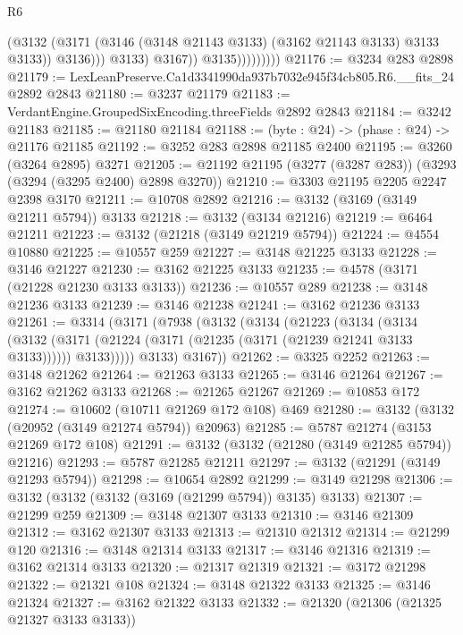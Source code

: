 \begin{lexlean}{R6}
\begin{coremodule}
                                (@3132
                                  (@3171
                                    (@3146 (@3148 @21143 @3133) (@3162 @21143 @3133) @3133 @3133))
                                  @3136)))
                            @3133)
                          @3167))
                      @3135)))))))))
@21176 := @3234 @283 @2898
@21179 := LexLeanPreserve.Ca1d3341990da937b7032e945f34cb805.R6.__fits_24 @2892 @2843
@21180 := @3237 @21179
@21183 := VerdantEngine.GroupedSixEncoding.threeFields @2892 @2843
@21184 := @3242 @21183
@21185 := @21180 @21184
@21188 := (byte : @24) -> (phase : @24) -> @21176 @21185
@21192 := @3252 @283 @2898 @21185 @2400
@21195 := @3260 (@3264 @2895) @3271
@21205 := @21192 @21195 (@3277 (@3287 @283)) (@3293 (@3294 (@3295 @2400) @2898 @3270))
@21210 := @3303 @21195 @2205 @2247 @2398 @3170
@21211 := @10708 @2892
@21216 := @3132 (@3169 (@3149 @21211 @5794)) @3133
@21218 := @3132 (@3134 @21216)
@21219 := @6464 @21211
@21223 := @3132 (@21218 (@3149 @21219 @5794))
@21224 := @4554 @10880
@21225 := @10557 @259
@21227 := @3148 @21225 @3133
@21228 := @3146 @21227
@21230 := @3162 @21225 @3133
@21235 := @4578 (@3171 (@21228 @21230 @3133 @3133))
@21236 := @10557 @289
@21238 := @3148 @21236 @3133
@21239 := @3146 @21238
@21241 := @3162 @21236 @3133
@21261 := @3314
    (@3171
      (@7938
        (@3132
          (@3134
            (@21223
              (@3134
                (@3134
                  (@3132
                    (@3171 (@21224 (@3171 (@21235 (@3171 (@21239 @21241 @3133 @3133))))))
                    @3133)))))
          @3133)
        @3167))
@21262 := @3325 @2252
@21263 := @3148 @21262
@21264 := @21263 @3133
@21265 := @3146 @21264
@21267 := @3162 @21262 @3133
@21268 := @21265 @21267
@21269 := @10853 @172
@21274 := @10602 (@10711 @21269 @172 @108) @469
@21280 := @3132 (@3132 (@20952 (@3149 @21274 @5794)) @20963)
@21285 := @5787 @21274 (@3153 @21269 @172 @108)
@21291 := @3132 (@3132 (@21280 (@3149 @21285 @5794)) @21216)
@21293 := @5787 @21285 @21211
@21297 := @3132 (@21291 (@3149 @21293 @5794))
@21298 := @10654 @2892
@21299 := @3149 @21298
@21306 := @3132 (@3132 (@3132 (@3169 (@21299 @5794)) @3135) @3133)
@21307 := @21299 @259
@21309 := @3148 @21307 @3133
@21310 := @3146 @21309
@21312 := @3162 @21307 @3133
@21313 := @21310 @21312
@21314 := @21299 @120
@21316 := @3148 @21314 @3133
@21317 := @3146 @21316
@21319 := @3162 @21314 @3133
@21320 := @21317 @21319
@21321 := @3172 @21298
@21322 := @21321 @108
@21324 := @3148 @21322 @3133
@21325 := @3146 @21324
@21327 := @3162 @21322 @3133
@21332 := @21320 (@21306 (@21325 @21327 @3133 @3133))

\end{coremodule}
\end{lexlean}

